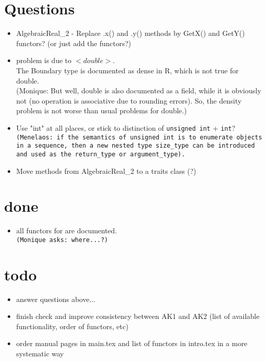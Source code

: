 \section{Questions}
\begin{itemize}
\item AlgebraicReal\_2 - Replace .x() and .y() methods by GetX() and 
	GetY() functors? (or just add the functors?)
\item problem is due to $<double>$.\\
    The Boundary type is documented as dense in R, which is not true
    for double.\\ (Monique: But well, double is also documented as a
    field, while it is obviously not (no operation is associative
    due to rounding errors). So, the density problem is not worse
    than usual problems for double.)
\item Use "int" at all places, or stick to distinction of \texttt{unsigned
   int} + \texttt{int}?\\
   \texttt{(Menelaos: if the semantics of \texttt{unsigned int} is to enumerate
   objects in a sequence, then a new nested type \texttt{size\_type}
   can be introduced and used as the \texttt{return\_type} or
   \texttt{argument\_type}).}
\end{itemize}

\begin{itemize}
\item Move methods from AlgebraicReal\_2 to a traits class (?)
\end{itemize}

\section{done} 
\begin{itemize}
\item all functors for  
      are documented. \\ \texttt{(Monique asks: where...?)}
\end{itemize}

\section{todo} 
\begin{itemize}
\item {} answer questions above...
\item {} finish check and improve consistency between AK1 and AK2 
(list of available functionality, order of functors, etc)
\item {} order manual pages in main.tex and list of functors in intro.tex in a more systematic way
\end{itemize} 

